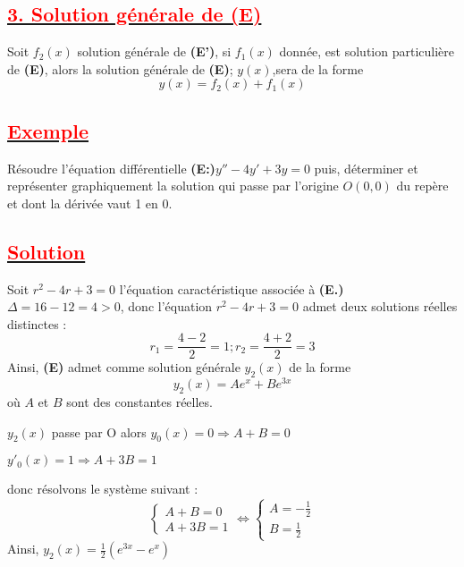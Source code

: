 \documentclass{article}
\begin{document}
\subsection*{\underline{\textbf{\textcolor{red}{3. Solution générale de (E)}}}}
Soit $f_{2}(x)$ solution générale de \textbf{(E')}, si $f_{1}(x)$ donnée, est solution particulière de \textbf{(E)}, alors la solution générale de \textbf{(E)}; $y(x)$,sera de la forme \[y(x)=f_{2}(x)+f_{1}(x) \]
\subsection*{\underline{\textbf{\textcolor{red}{Exemple}}}}
Résoudre l'équation différentielle \textbf{(E:)}$y''-4y'+3y=0$ puis, déterminer et représenter graphiquement la solution qui passe par l'origine $O(0,0)$ du repère et dont la dérivée vaut 1 en 0.
\subsection*{\underline{\textbf{\textcolor{red}{Solution}}}}
Soit $r^{2}-4r+3=0$ l'équation caractéristique associée à \textbf{(E.)}
$\Delta = 16-12=4>0$, donc l'équation $r^{2}-4r+3=0$ admet deux solutions réelles distinctes :
\[r_{1}=\frac{4-2}{2}=1; r_{2}=\frac{4+2}{2}=3\]
Ainsi, \textbf{(E)} admet comme solution générale $y_{2}(x)$ de la forme \[y_{2}(x)=Ae^{x}+Be^{3x}\]
où $A$ et $B$ sont des constantes réelles.

$y_{2}(x)$ passe par O alors $y_{0}(x)=0 \Longrightarrow A+B=0$

$y'_{0}(x)=1 \Longrightarrow  A+3B=1$

donc résolvons le système suivant :
\[
\begin{cases}
    A+B=0 \\
    A+3B=1
\end{cases}
\Leftrightarrow 
\begin{cases}
    A=-\frac{1}{2} \\
    B=\frac{1}{2}
\end{cases}
\]
Ainsi, $y_{2}(x)=\frac{1}{2}(e^{3x}-e^{x})$
\end{document}

